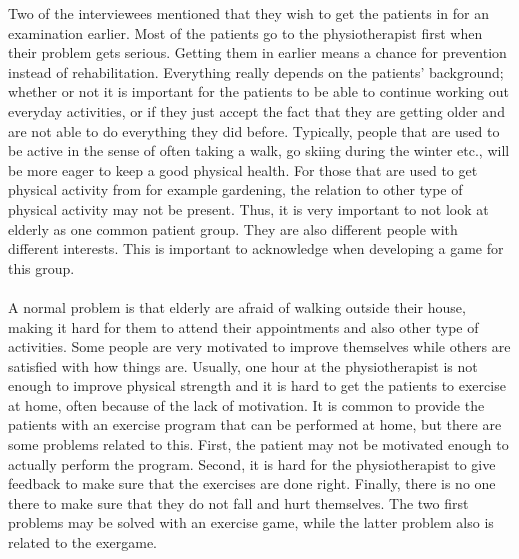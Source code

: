 Two of the interviewees mentioned that they wish to get the patients in for an examination earlier. Most of the patients go to the physiotherapist first when their problem gets serious. Getting them in earlier means a chance for prevention instead of rehabilitation. Everything really depends on the patients' background; whether or not it is important for the patients to be able to continue working out everyday activities, or if they just accept the fact that they are getting older and are not able to do everything they did before. Typically, people that are used to be active in the sense of often taking a walk, go skiing during the winter etc., will be more eager to keep a good physical health. For those that are used to get physical activity from for example gardening, the relation to other type of physical activity may not be present. Thus, it is very important to not look at elderly as one common patient group. They are also different people with different interests. This is important to acknowledge when developing a game for this group.\\ \\
A normal problem is that elderly are afraid of walking outside their house, making it hard for them to attend their appointments and also other type of activities. Some people are very motivated to improve themselves while others are satisfied with how things are. Usually, one hour at the physiotherapist is not enough to improve physical strength and it is hard to get the patients to exercise at home, often because of the lack of motivation. It is common to provide the patients with an exercise program that can be performed at home, but there are some problems related to this. First, the patient may not be motivated enough to actually perform the program. Second, it is hard for the physiotherapist to give feedback to make sure that the exercises are done right. Finally, there is no one there to make sure that they do not fall and hurt themselves. The two first problems may be solved with an exercise game, while the latter problem also is related to the exergame.  \\ \\

